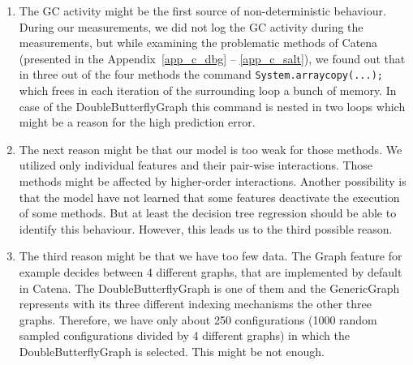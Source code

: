 \begin{enumerate}
	\item The \ac{GC} activity might be the first source of non-deterministic behaviour. During our measurements, we did not log the \ac{GC} activity during the measurements, but while examining the problematic methods of Catena (presented in the Appendix~\ref{app_c_dbg} -- \ref{app_c_salt}), we found out that in three out of the four methods the command \texttt{System.arraycopy(...);} which frees in each iteration of the surrounding loop a bunch of memory. In case of the DoubleButterflyGraph this command is nested in two loops which might be a reason for the high prediction error. 
	\item The next reason might be that our model is too weak for those methods. We utilized only individual features and their pair-wise interactions. Those methods might be affected by higher-order interactions. Another possibility is that the model have not learned that some features deactivate the execution of some methods. But at least the decision tree regression should be able to identify this behaviour. However, this leads us to the third possible reason.
	\item The third reason might be that we have too few data. The Graph feature for example decides between 4 different graphs, that are implemented by default in Catena. The DoubleButterflyGraph is one of them and the GenericGraph represents with its three different indexing mechanisms the other three graphs. Therefore, we have only about 250 configurations (1000 random sampled configurations divided by 4 different graphs) in which the DoubleButterflyGraph is selected. This might be not enough.
\end{enumerate}


%


